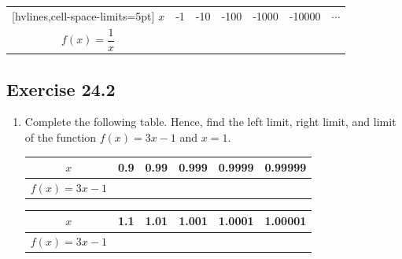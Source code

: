 \documentclass[12pt]{report}
\begin{document}
\begin{center}
  \begin{NiceTabular}{|c|c|c|c|c|c|c|}[hvlines,cell-space-limits=5pt]
    $x$                   & -1 & -10 & -100 & -1000 & -10000 & $\cdots$ \\
    $f (x) = \dfrac{1}{x}$ &    &     &      &       &        &          \\
  \end{NiceTabular}
\end{center}

\subsection{Exercise 24.2}

\begin{enumerate}
  \item Complete the following table. Hence, find the left limit, right limit, and
        limit of the function $f (x) = 3x - 1$ and $x = 1$.
        \begin{center}
          \begin{tabular}{|c|c|c|c|c|c|}
            \hline
            $x$              & 0.9 & 0.99 & 0.999 & 0.9999 & 0.99999 \\
            \hline
            $f (x) = 3x - 1$ &     &      &       &        &         \\
            \hline
          \end{tabular}
          \vskip 0.2cm
          \begin{tabular}{|c|c|c|c|c|c|}
            \hline
            $x$              & 1.1 & 1.01 & 1.001 & 1.0001 & 1.00001 \\
            \hline
            $f (x) = 3x - 1$ &     &      &       &        &         \\
            \hline
          \end{tabular}
        \end{center}


\end{enumerate}
\end{document}
